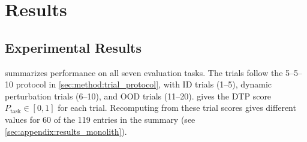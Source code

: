 \chapter{Results}

\section{Experimental Results}

 summarizes performance on all seven evaluation tasks. The trials follow the 5--5--10 protocol in \cref{sec:method:trial_protocol}, with \ac{ID} trials (1--5), dynamic perturbation trials (6--10), and \ac{OOD} trials (11--20).  gives the \ac{DTP} score $P_{\text{task}} \in [0, 1]$ for each trial. Recomputing from these trial scores gives different values for 60 of the 119 entries in the summary (see \cref{sec:appendix:results_monolith}).

